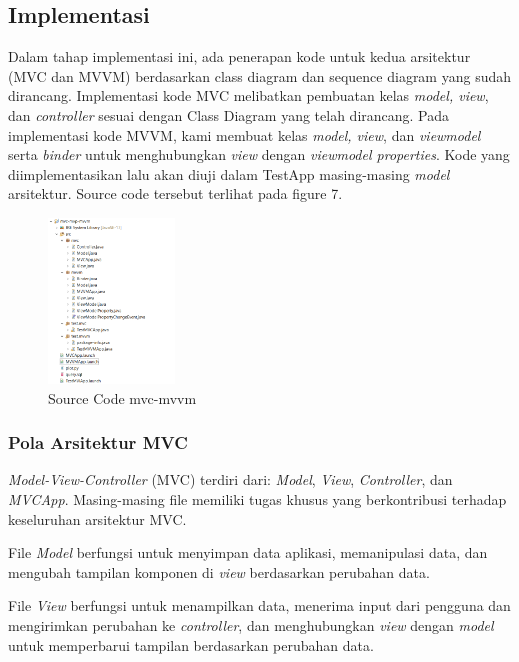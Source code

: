 \documentclass[conference]{IEEEtran}
\begin{document}
	\subsection{Implementasi}
	Dalam tahap implementasi ini, ada penerapan kode untuk kedua arsitektur (MVC dan MVVM) berdasarkan class diagram dan sequence diagram yang sudah dirancang. Implementasi kode MVC melibatkan pembuatan kelas \textit{model, view}, dan \textit{controller} sesuai dengan Class Diagram yang telah dirancang. Pada implementasi kode MVVM, kami membuat kelas \textit{model, view}, dan \textit{viewmodel} serta \textit{binder} untuk menghubungkan \textit{view} dengan \textit{viewmodel properties}. Kode yang diimplementasikan lalu akan diuji dalam TestApp masing-masing \textit{model} arsitektur. Source code tersebut terlihat pada figure 7.
	
	\begin{figure}[h]
		\centering
		\includegraphics[width=0.3\textwidth]{images/ImplementasiKode}
		\caption{Source Code mvc-mvvm}
		\label{fig:mvc_mvvm}
	\end{figure}
	
	\subsubsection{Pola Arsitektur MVC}
	\textit{Model-View-Controller} (MVC) terdiri dari: \textit{Model}, \textit{View}, \textit{Controller}, dan \textit{MVCApp}. Masing-masing file memiliki tugas khusus yang berkontribusi terhadap keseluruhan arsitektur MVC.
	
	File \textit{Model} berfungsi untuk menyimpan data aplikasi, memanipulasi data, dan mengubah tampilan komponen di \textit{view} berdasarkan perubahan data. 
	
	File \textit{View} berfungsi untuk menampilkan data, menerima input dari pengguna dan mengirimkan perubahan ke \textit{controller}, dan menghubungkan \textit{view} dengan \textit{model} untuk memperbarui tampilan berdasarkan perubahan data. 
	
\end{document}
